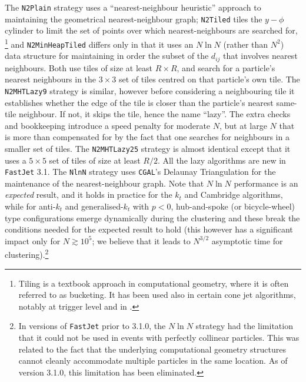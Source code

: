 \documentclass[12pt,a4]{article}
\newcommand{\fastjet}{\texttt{FastJet}\xspace}
\newcommand{\ttt}[1]{{\small\texttt{#1}}}
\begin{document}
The \ttt{N2Plain} strategy uses a ``nearest-neighbour heuristic''
\cite{Anderberg} approach to maintaining the geometrical
nearest-neighbour graph; \ttt{N2Tiled} tiles the $y-\phi$ cylinder
to limit the set of points over which nearest-neighbours are searched
for,%
\footnote{Tiling is a textbook approach in computational geometry,
  where it is often referred to as bucketing. It has been used also in
  certain cone jet algorithms, notably at trigger level and in
  \cite{Sonnenschein}.} %
and \ttt{N2MinHeapTiled} differs only in that it uses an $N\ln N$
(rather than $N^2$) data structure for maintaining in order the subset
of the $d_{ij}$ that involves nearest neighbours.
%
Both use tiles of size at least $R\times R$, and search for a
particle's nearest neighbours in the $3\times 3$ set of tiles centred
on that particle's own tile.
%
The \ttt{N2MHTLazy9} strategy is similar, however before considering a
neighbouring tile it establishes whether the edge of the tile is
closer than the particle's nearest same-tile neighbour.
%
If not, it skips the tile, hence the name ``lazy''.
%
The extra checks and bookkeeping introduce a speed penalty for
moderate $N$, but at large $N$ that is more than compensated for by
the fact that one searches for neighbours in a smaller set
of tiles.
%
The \ttt{N2MHTLazy25} strategy is almost identical except that it uses
a $5\times 5$ set of tiles of size at least $R/2$.
%
All the lazy algorithms are new in \fastjet 3.1.
%
The \ttt{NlnN} strategy uses \ttt{CGAL}'s Delaunay Triangulation
\cite{CGAL} for the maintenance of the nearest-neighbour graph.
%
Note that $N \ln N$ performance is an \emph{expected} result, and
it holds in practice for the $k_t$ and Cambridge algorithms, while for
anti-$k_t$ and generalised-$k_t$ with $p<0$, hub-and-spoke (or
bicycle-wheel) type configurations emerge dynamically during the
clustering and these break the conditions needed for the expected
result to hold (this however has a significant impact only for $N
\gtrsim 10^5$; we believe that it leads to $N^{3/2}$ asymptotic time
for clustering).\footnote{%
  In versions of \fastjet prior to 3.1.0, the $N \ln N$ strategy had
  the limitation that it could not be used in events with perfectly
  collinear particles.
  This was related to the fact that the underlying computational geometry
  structures cannot cleanly accommodate multiple particles in the same
  location.
  As of version 3.1.0, this limitation has been eliminated.
}
\end{document}
